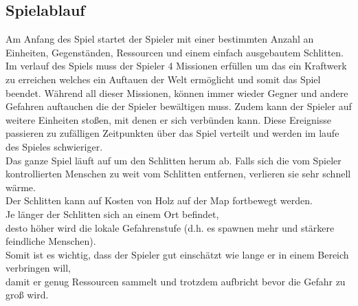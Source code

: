 \documentclass[a4paper,
  twoside, %
  headlines=2.1 %
  ]{scrartcl}
\begin{document}
	\subsection{Spielablauf}
	Am Anfang des Spiel startet der Spieler mit einer bestimmten Anzahl an Einheiten, Gegenständen, Ressourcen und einem einfach ausgebautem Schlitten.
	Im verlauf des Spiels muss der Spieler 4 Missionen erfüllen um das ein Kraftwerk zu erreichen welches ein Auftauen der Welt ermöglicht 
	und somit das Spiel beendet. Während all dieser Missionen, können immer
	wieder Gegner und andere Gefahren auftauchen die der Spieler bewältigen
	muss. Zudem kann der Spieler auf weitere Einheiten stoßen, mit denen er sich
	verbünden kann. Diese Ereignisse passieren zu zufälligen Zeitpunkten über
	das Spiel verteilt und werden im laufe des Spieles schwieriger. \\
	Das ganze Spiel läuft auf um den Schlitten herum ab. Falls sich die vom Spieler kontrollierten Menschen zu weit vom Schlitten entfernen, verlieren sie sehr schnell wärme.\\
	Der Schlitten kann auf Kosten von Holz auf der Map fortbewegt werden. \\
	Je länger der Schlitten sich an einem Ort befindet,\\
	desto höher wird die lokale Gefahrenstufe (d.h. es spawnen mehr und stärkere feindliche Menschen).\\
	Somit ist es wichtig, dass der Spieler gut einschätzt wie lange er in einem Bereich verbringen will,\\
	damit er genug Ressourcen sammelt und trotzdem aufbricht bevor die Gefahr zu groß wird.\\
\end{document}
